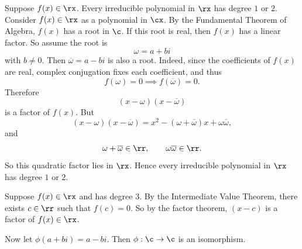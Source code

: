 \begin{proposition}{
    Suppose $f(x)\in\rx$.
    Every irreducible polynomial in $\rx$ has degree $1$ or $2$.
}
    Consider $f(x)\in\rx$ as a polynomial in $\cx$.
    By the Fundamental Theorem of Algebra, $f(x)$ has a root in $\c$.
    If this root is real, then $f(x)$ has a linear factor.
    So assume the root is
    \[
        \omega=a+bi
    \]
    with $b\neq 0$.
    Then $\overline{\omega}=a-bi$ is also a root.
    Indeed, since the coefficients of $f(x)$ are real, complex conjugation fixes each coefficient, and thus
    \[
        f(\omega)=0 \implies f(\overline{\omega})=0.
    \]
    Therefore
    \[
        (x-\omega)(x-\overline{\omega})
    \]
    is a factor of $f(x)$.
    But
    \[
        (x-\omega)(x-\overline{\omega})=x^2-(\omega+\overline{\omega})x+\omega\overline{\omega},
    \]
    and
    \[
        \omega+\overline{\omega}\in\rr,\qquad \omega\overline{\omega}\in\rr.
    \]
    So this quadratic factor lies in $\rx$.
    Hence every irreducible polynomial in $\rx$ has degree $1$ or $2$.
\end{proposition}

\begin{example}
    Suppose $f(x)\in\rx$ and has degree $3$.
    By the Intermediate Value Theorem, there exists $c\in\rr$ such that $f(c)=0$.
    So by the factor theorem, $(x-c)$ is a factor of $f(x)\in\rx$.
\end{example}

\begin{lemma*}{
    Now let $\phi(a+bi)=a-bi$.
    Then $\phi:\c\to\c$ is an isomorphism.
}
\end{lemma*}